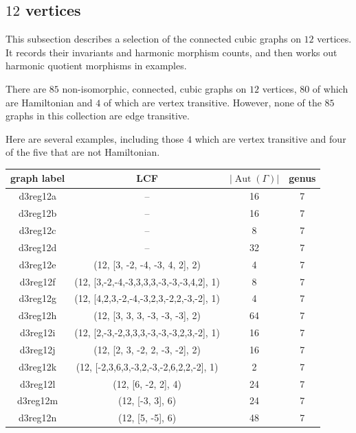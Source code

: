 \documentclass[12pt,letterpaper]{article}
\theoremstyle{definition}
\DeclareMathOperator{\Aut}{Aut}
\begin{document}
\subsection{\texorpdfstring{$12$}{12} vertices}
\label{sec:cubic-12-vertices}

This subsection describes a selection of the connected cubic graphs on $12$ vertices.
It records their invariants and harmonic morphism counts, and then
works out harmonic quotient morphisms in examples.


There are $85$ non-isomorphic, connected, cubic graphs on $12$ vertices,
$80$ of which are Hamiltonian and $4$ of which are vertex transitive.
However, none of the $85$ graphs
in this collection are edge transitive.

Here are several examples,
including those $4$ which are vertex transitive and
four of the five that are not Hamiltonian.


{\small{
\begin{center}
\begin{tabular}{c|c|c|c}
  graph label & LCF & $|\Aut(\Gamma)|$ & genus  \\ \hline
  d3reg12a & -- & 16 & 7   \\
  d3reg12b & -- & 16 & 7  \\
  d3reg12c & -- & 8 & 7   \\
  d3reg12d & -- & 32 & 7  \\
  d3reg12e & (12, [3, -2, -4, -3, 4, 2], 2) & 4 & 7  \\
  d3reg12f & (12, [3,-2,-4,-3,3,3,3,-3,-3,-3,4,2], 1) & 8 & 7   \\
  d3reg12g & (12, [4,2,3,-2,-4,-3,2,3,-2,2,-3,-2], 1) & 4 & 7  \\
  d3reg12h & (12, [3, 3, 3, -3, -3, -3], 2) & 64 & 7  \\
  d3reg12i & (12, [2,-3,-2,3,3,3,-3,-3,-3,2,3,-2], 1) & 16 & 7   \\
  d3reg12j & (12, [2, 3, -2, 2, -3, -2], 2) & 16 & 7  \\
  d3reg12k & (12, [-2,3,6,3,-3,2,-3,-2,6,2,2,-2], 1) & 2 & 7  \\
  d3reg12l & (12, [6, -2, 2], 4) & 24 & 7  \\
  d3reg12m & (12, [-3, 3], 6) & 24 & 7  \\
  d3reg12n & (12, [5, -5], 6) & 48 & 7  \\
  
\end{tabular}
\end{center}  
}}
\end{document}
